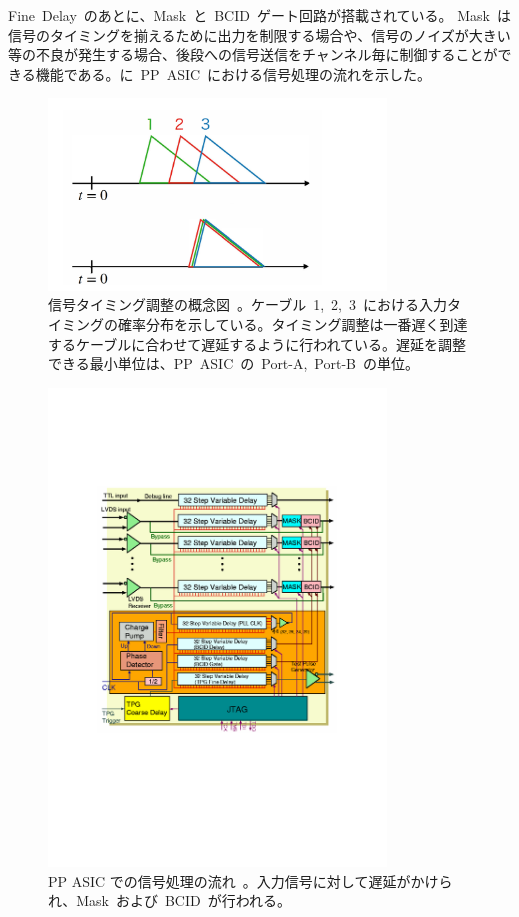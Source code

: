Fine~Delay~のあとに、Mask~と~BCID~ゲート回路が搭載されている。
Mask~は信号のタイミングを揃えるために出力を制限する場合や、信号のノイズが大きい等の不良が発生する場合、後段への信号送信をチャンネル毎に制御することができる機能である。に~PP~ASIC~における信号処理の流れを示した。
\begin{figure}[H]
        \centering   
        \includegraphics[width=0.8\textwidth,page=1]{img/slide/slide.pdf}
        \caption[信号タイミング調整の概念図]{信号タイミング調整の概念図~\cite{URL:09}。ケーブル~1,~2,~3~における入力タイミングの確率分布を示している。タイミング調整は一番遅く到達するケーブルに合わせて遅延するように行われている。遅延を調整できる最小単位は、PP~ASIC~の~Port-A,~Port-B~の単位。}
        \label{fig:delay}
\end{figure}

\begin{figure}[H]
        \centering   
        \includegraphics[width=0.8\textwidth,page=1]{img/pdf/PP.pdf}
        \caption[PP ASIC での信号処理の流れ]{PP ASIC での信号処理の流れ~\cite{URL:05}。入力信号に対して遅延がかけられ、Mask~および~BCID~が行われる。}
        \label{fig:PP}
\end{figure}

